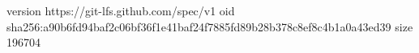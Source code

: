 version https://git-lfs.github.com/spec/v1
oid sha256:a90b6fd94baf2c06bf36f1e41baf24f7885fd89b28b378c8ef8c4b1a0a43ed39
size 196704

